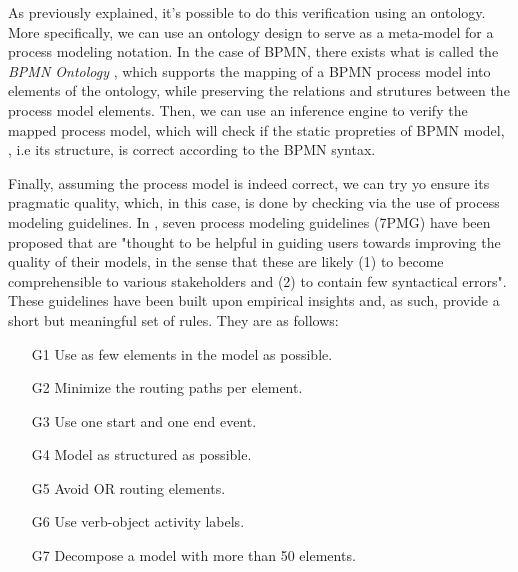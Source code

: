 \documentclass[a4paper,twoside]{article}
\begin{document}
As previously explained, it's possible to do this verification using an ontology. More specifically, we can use an ontology design to serve as a meta-model for a process modeling notation. In the case of BPMN, there exists what is called the \textit{BPMN Ontology} \cite{Rospocher2014foisbpmn}, which supports the mapping of a BPMN process model into elements of the ontology, while preserving the relations and strutures between the process model elements. Then, we can use an inference engine to verify the mapped process model, which will check if the static propreties of BPMN model, , i.e its structure, is correct according to the BPMN syntax.



Finally, assuming the process model is indeed correct, we can try yo ensure its pragmatic quality, which, in this case, is done by checking via the use of process modeling guidelines.  In \cite{Mendling2010}, seven process modeling guidelines (7PMG) have been proposed that are "thought to be helpful in guiding users towards improving the quality of their models, in the sense that these are likely (1) to become comprehensible to various stakeholders and (2) to contain few syntactical errors". These guidelines have been built upon empirical insights and, as such, provide a short but meaningful set of rules. They are as follows:
\begin{enumerate}
	\item[G1] Use as few elements in the model as possible.
	\item[G2] Minimize the routing paths per element.
	\item[G3] Use one start and one end event.
	\item[G4] Model as structured as possible. 
	\item[G5] Avoid OR routing elements.
	\item[G6] Use verb-object activity labels.
	\item[G7] Decompose a model with more than 50 elements.
\end{enumerate}
\end{document}
